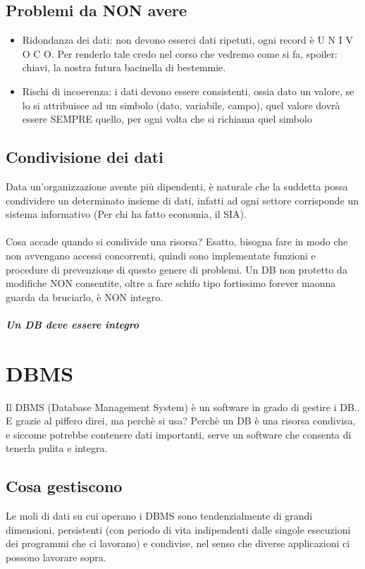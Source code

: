 \documentclass[12pt, a4paper, openany, twoside]{book}
\begin{document}
\section{Problemi da NON avere}
\begin{itemize}
	\item Ridondanza dei dati: non devono esserci dati ripetuti, ogni record è
	U N I V O C O. Per renderlo tale credo nel corso che vedremo come si fa, 
	spoiler: chiavi, la nostra futura bacinella di bestemmie.
	\item Rischi di incoerenza: i dati devono essere consistenti, ossia dato un
	valore, se lo si attribuisce ad un simbolo (dato, variabile, campo), quel
	valore dovrà essere SEMPRE quello, per ogni volta che si richiama quel 
	simbolo
\end{itemize}
\section{Condivisione dei dati}
Data un'organizzazione avente più dipendenti, è naturale che la suddetta possa
condividere un determinato insieme di dati, infatti ad ogni settore corrisponde
un sistema informativo (Per chi ha fatto economia, il SIA).\\ \\
Cosa accade quando si condivide una risorsa? Esatto, bisogna fare in modo che
non avvengano accessi concorrenti, quindi sono implementate funzioni e 
procedure di prevenzione di questo genere di problemi. Un DB non protetto da
modifiche NON consentite, oltre a fare schifo tipo fortissimo forever maonna guarda
da bruciarlo, è NON integro. 
\paragraph{Un DB deve essere integro}
\chapter{DBMS}
Il DBMS (Database Management System) è un software in grado di gestire i 
DB.. E grazie al piffero direi, ma perchè si usa? Perchè un DB è una risorsa
condivisa, e siccome potrebbe contenere dati importanti, serve un software che
consenta di tenerla pulita e integra.
\section{Cosa gestiscono}
Le moli di dati su cui operano i DBMS sono tendenzialmente di grandi dimensioni,
persistenti (con periodo di vita indipendenti dalle singole esecuzioni dei 
programmi che ci lavorano) e condivise, nel senso che diverse applicazioni ci 
possono lavorare sopra.
\end{document}
